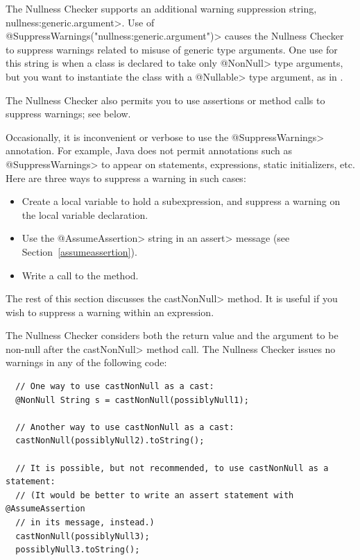 The Nullness Checker supports an additional warning suppression string,
\<nullness:generic.argument>.
Use of \<@SuppressWarnings("nullness:generic.argument")> causes the Nullness
Checker to suppress warnings related to misuse of generic type
arguments.  One use for this string is when a class is declared to take only
\<@NonNull> type arguments, but you want to instantiate the class with a
\<@Nullable> type argument, as in .

The Nullness Checker also permits you to use assertions or method calls to
suppress warnings; see below.




Occasionally, it is inconvenient or
verbose to use the \<@SuppressWarnings> annotation.  For example, Java does
not permit annotations such as \<@SuppressWarnings> to appear on
statements, expressions, static initializers, etc.
Here are three ways to suppress a warning in such cases:
\begin{itemize}
\item
  Create a local variable to hold a subexpression, and
  suppress a warning on the local variable declaration.
\item
  Use the \<@AssumeAssertion> string in
  an \<assert> message (see Section~\ref{assumeassertion}).
\item
  Write a call to the
   method.
\end{itemize}

The rest of this section discusses the \<castNonNull> method.
It is useful if you wish to suppress a warning within an expression.

The Nullness Checker considers both the return value and the
argument to be non-null after the \<castNonNull> method call.
The Nullness Checker issues no warnings in any of the following
code:

\begin{Verbatim}
  // One way to use castNonNull as a cast:
  @NonNull String s = castNonNull(possiblyNull1);

  // Another way to use castNonNull as a cast:
  castNonNull(possiblyNull2).toString();

  // It is possible, but not recommended, to use castNonNull as a statement:
  // (It would be better to write an assert statement with @AssumeAssertion
  // in its message, instead.)
  castNonNull(possiblyNull3);
  possiblyNull3.toString();
\end{Verbatim}

